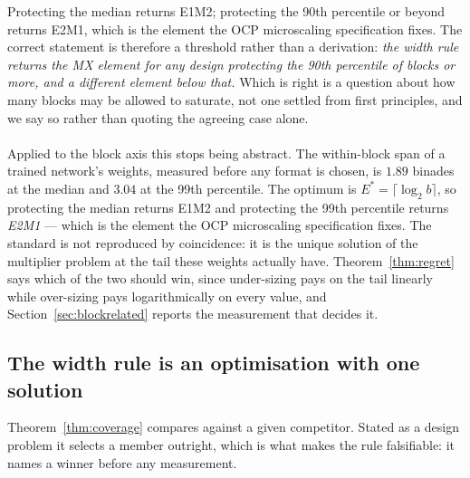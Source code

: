 Protecting the median returns E1M2; protecting the 90th percentile or beyond
returns E2M1, which is the element the OCP microscaling specification fixes. The
correct statement is therefore a threshold rather than a derivation: \emph{the
width rule returns the MX element for any design protecting the 90th percentile
of blocks or more, and a different element below that.} Which is right is a
question about how many blocks may be allowed to saturate, not one settled from
first principles, and we say so rather than quoting the agreeing case alone.

\paragraph{} Applied to the block axis this stops being
abstract. The within-block span of a trained network's weights, measured before
any format is chosen, is $1.89$ binades at the median and $3.04$ at the 99th
percentile. The optimum is $E^{*} = \lceil \log_2 b \rceil$, so protecting the
median returns E1M2 and protecting the 99th percentile returns \emph{E2M1} ---
which is the element the OCP microscaling specification fixes. The standard is not
reproduced by coincidence: it is the unique solution of the multiplier problem at
the tail these weights actually have. Theorem~\ref{thm:regret} says which of the
two should win, since under-sizing pays on the tail linearly while over-sizing pays
logarithmically on every value, and Section~\ref{sec:blockrelated} reports the
measurement that decides it.



\subsection{The width rule is an optimisation with one solution}

\label{sec:widthrule}

Theorem~\ref{thm:coverage} compares against a given competitor. Stated as a
design problem it selects a member outright, which is what makes the rule
falsifiable: it names a winner before any measurement.

